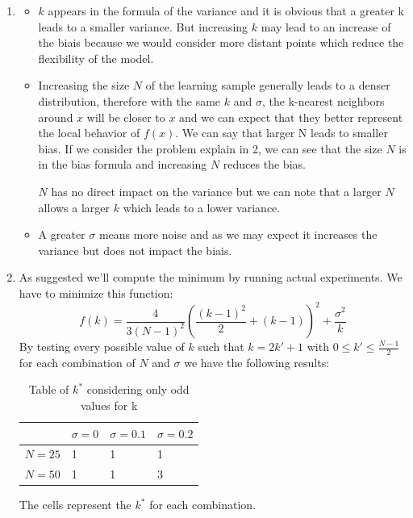 \documentclass[a4paper,10pt]{article}
\begin{document}
\begin{enumerate}
    
    \item 
    \begin{itemize}
        \item 
        $k$ appears in the formula of the variance and it is obvious that a greater k leads to a smaller variance. But increasing $k$ may lead to an increase of the biais because we would consider more distant points which reduce the flexibility of the model.
        \item
        Increasing the size $N$ of the learning sample generally leads to a denser distribution, therefore with the same $k$ and $\sigma$, the k-nearest neighbors around $x$ will be closer to $x$ and we can expect that they better represent the local behavior of $f(x)$.
        We can say that larger N leads to smaller bias. If we consider the problem explain in 2, we can see that the size $N$ is in the bias formula and increasing $N$ reduces the bias.

        $N$ has no direct impact on the variance but we can note that a larger $N$ allows a larger $k$ which leads to a lower variance. 
        \item 
        A greater $\sigma$ means more noise and as we may expect it increases the variance but does not impact the biais.
    \end{itemize}


    
    \item
    As suggested we'll compute the minimum by running actual experiments. We have to minimize this function:
    $$
    f(k) = \frac{4}{{3(N-1)^2}} \left(\frac{(k-1)^2}{2} + (k-1)\right)^2 + \frac{\sigma^2}{k}
    $$
    By testing every possible value of $k$ such that $k = 2k' + 1$ with $0 \le k' \le \frac{N-1}{2}$ for each combination of $N$ and $\sigma$ we have the following results:
    \begin{table}[H]
      \centering
      \begin{tabular}{l|l|l|l|}
      \cline{2-4}
                               & $\sigma = 0$ & $\sigma = 0.1$ & $\sigma = 0.2$ \\ \hline
      \multicolumn{1}{|l|}{$N = 25$} & 1  &  1  &  1 \\ \hline
      \multicolumn{1}{|l|}{$N = 50$} & 1  &  1   &  3 \\ \hline
      \end{tabular}
      \caption{Table of $k^*$ considering only odd values for k}
    \end{table}
    The cells represent the $k^*$ for each combination.


\end{enumerate}
\end{document}
